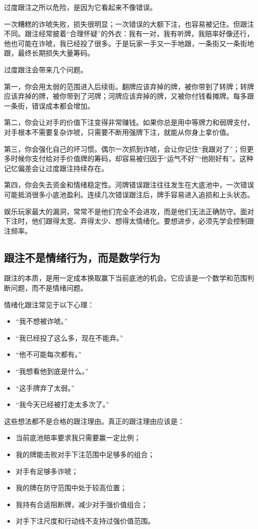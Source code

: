 过度跟注之所以危险，是因为它看起来不像错误。

一次糟糕的诈唬失败，损失很明显；一次错误的大额下注，也容易被记住。但跟注不同。跟注经常披着“合理怀疑”的外衣：我有一对，我有听牌，我赔率好像还行，他也可能在诈唬，我已经投了很多。于是玩家一手又一手地跟，一条街又一条街地跟，最终长期损失大量筹码。

过度跟注会带来几个问题。

第一，你会用太弱的范围进入后续街。翻牌应该弃掉的牌，被你带到了转牌；转牌应该弃掉的牌，被你带到了河牌；河牌应该弃掉的牌，又被你付钱看摊牌。每多跟一条街，错误成本都会增加。

第二，你会让对手的价值下注变得非常赚钱。如果你总是用中等牌力和弱牌支付，对手根本不需要复杂诈唬，只需要不断用强牌下注，就能从你身上拿价值。

第三，你会强化自己的坏习惯。偶尔一次抓到诈唬，会让你记住“我跟对了”；但更多时候你支付给对手价值牌的筹码，却容易被归因于“运气不好”“他刚好有”。这种记忆偏差会让过度跟注持续存在。

第四，你会失去资金和情绪稳定性。河牌错误跟注往往发生在大底池中，一次错误可能抵消很多小底池盈利。连续几次错误跟注后，牌手容易进入追损和上头状态。

娱乐玩家最大的漏洞，常常不是他们完全不会进攻，而是他们无法正确防守。面对下注时，他们跟得太宽、弃得太少、想得太情绪化。要想进步，必须先学会控制跟注频率。

\subsection{跟注不是情绪行为，而是数学行为}

跟注的本质，是用一定成本换取赢下当前底池的机会。它应该是一个数学和范围判断问题，而不是情绪问题。

情绪化跟注常见于以下心理：

\begin{itemize}
\item “我不想被诈唬。”
\item “我已经投了这么多，现在不能弃。”
\item “他不可能每次都有。”
\item “我想看他到底是什么。”
\item “这手牌弃了太弱。”
\item “我今天已经被打走太多次了。”
\end{itemize}

这些想法都不是合格的跟注理由。真正的跟注理由应该是：

\begin{itemize}
\item 当前底池赔率要求我只需要赢一定比例；
\item 我的牌能击败对手下注范围中足够多的组合；
\item 对手有足够多诈唬；
\item 我的牌在防守范围中处于较高位置；
\item 我持有合适阻断牌，减少对手强价值组合；
\item 对手下注尺度和行动线不支持过强价值范围。
\end{itemize}

